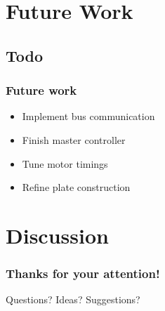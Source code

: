 \documentclass{beamer}
\begin{document}
\section{Future Work}
\subsection{Todo}
\begin{frame}
  \frametitle{Future work}
    \begin{itemize}
    \item Implement bus communication
    \item Finish master controller
    \item Tune motor timings
    \item Refine plate construction
  \end{itemize}
\end{frame}

\section{Discussion}
\begin{frame}
  \frametitle{Thanks for your attention!}
  \huge{Questions? Ideas? Suggestions?}
\end{frame}
\end{document}
